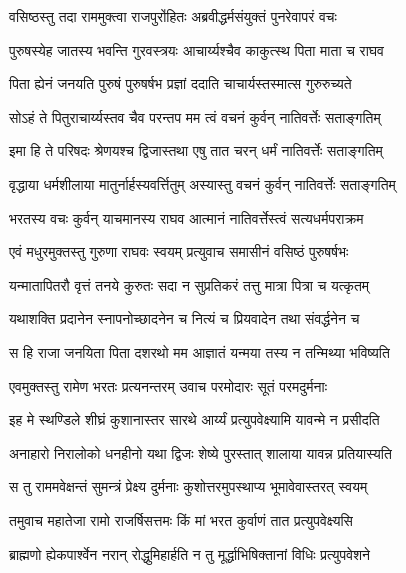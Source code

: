 
\twolineshloka
{वसिष्ठस्तु तदा राममुक्त्वा राजपुरोऺहितः}
{अब्रवीद्धर्मसंयुक्तं पुनरेवापरं वचः} %

\twolineshloka
{पुरुषस्येह जातस्य भवन्ति गुरवस्त्रयः}
{आचार्य्यश्चैव काकुत्स्थ पिता माता च राघव} %

\twolineshloka
{पिता ह्येनं जनयति पुरुषं पुरुषर्षभ}
{प्रज्ञां ददाति चाचार्यस्तस्मात्स गुरुरुच्यते} %

\twolineshloka
{सोऽहं ते पितुराचार्य्यस्तव चैव परन्तप}
{मम त्वं वचनं कुर्वन् नातिवर्त्तेः सताङ्गतिम्} %

\twolineshloka
{इमा हि ते परिषदः श्रेणयश्च द्विजास्तथा}
{एषु तात चरन् धर्मं नातिवर्त्तेः सताङ्गतिम्} %

\twolineshloka
{वृद्धाया धर्मशीलाया मातुर्नार्हस्यवर्त्तितुम्}
{अस्यास्तु वचनं कुर्वन् नातिवर्त्तेः सताङ्गतिम्} %

\twolineshloka
{भरतस्य वचः कुर्वन् याचमानस्य राघव}
{आत्मानं नातिवर्त्तेस्त्वं सत्यधर्मपराक्रम} %

\twolineshloka
{एवं मधुरमुक्तस्तु गुरुणा राघवः स्वयम्}
{प्रत्युवाच समासीनं वसिष्ठं पुरुषर्षभः} %

\twolineshloka
{यन्मातापितरौ वृत्तं तनये कुरुतः सदा}
{न सुप्रतिकरं तत्तु मात्रा पित्रा च यत्कृतम्} %

\twolineshloka
{यथाशक्ति प्रदानेन स्नापनोच्छादनेन च}
{नित्यं च प्रियवादेन तथा संवर्द्धनेन च} %

\twolineshloka
{स हि राजा जनयिता पिता दशरथो मम}
{आज्ञातं यन्मया तस्य न तन्मिथ्या भविष्यति} %

\twolineshloka
{एवमुक्तस्तु रामेण भरतः प्रत्यनन्तरम्}
{उवाच परमोदारः सूतं परमदुर्मनाः} %

\twolineshloka
{इह मे स्थण्डिले शीघ्रं कुशानास्तर सारथे}
{आर्य्यं प्रत्युपवेक्ष्यामि यावन्मे न प्रसीदति} %

\twolineshloka
{अनाहारो निरालोको धनहीनो यथा द्विजः}
{शेष्ये पुरस्तात् शालाया यावन्न प्रतियास्यति} %

\twolineshloka
{स तु राममवेक्षन्तं सुमन्त्रं प्रेक्ष्य दुर्मनाः}
{कुशोत्तरमुपस्थाप्य भूमावेवास्तरत् स्वयम्} %

\twolineshloka
{तमुवाच महातेजा रामो राजर्षिसत्तमः}
{किं मां भरत कुर्वाणं तात प्रत्युपवेक्ष्यसि} %

\twolineshloka
{ब्राह्मणो ह्येकपार्श्वेन नरान् रोद्धुमिहार्हति}
{न तु मूर्द्धाभिषिक्तानां विधिः प्रत्युपवेशने} %

